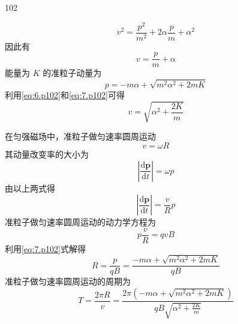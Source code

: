 \begin{solution}{102}
\begin{subsolution}
        \begin{equation*}
            v ^ {2} = \frac {p ^ {2}}{m ^ {2}} + 2 \alpha \frac {p}{m} + \alpha^ {2}
        \end{equation*}
        因此有
        \begin{equation}
            v = \frac {p}{m} + \alpha
            \label{eq:6.p102}
        \end{equation}
        能量为 $K$ 的准粒子动量为
        \begin{equation}
            p = - m \alpha + \sqrt {m ^ {2} \alpha^ {2} + 2 m K}
            \label{eq:7.p102}
        \end{equation}
        利用\eqref{eq:6.p102}和\eqref{eq:7.p102}可得
        \begin{equation}
            v = \sqrt {\alpha^ {2} + \frac {2 K}{m}}
            \label{eq:8.p102}
        \end{equation}
    \end{subsolution}
    \begin{subsolution}
        在匀强磁场中，准粒子做匀速率圆周运动
        \begin{equation*}
            v = \omega R
        \end{equation*}
        其动量改变率的大小为
        \begin{equation*}
            \left| \frac {\mathrm{d} \boldsymbol {p}}{\mathrm{d} t} \right| = \omega p
        \end{equation*}
        由以上两式得
        \begin{equation}
            \left| \frac {\mathrm{d} \boldsymbol {p}}{\mathrm{d} t} \right| = \frac {v}{R} p
            \label{eq:9.p102}
        \end{equation}
        准粒子做匀速率圆周运动的动力学方程为
        \begin{equation}
            p \frac {v}{R} = q v B
            \label{eq:10.p102}
        \end{equation}
        利用\eqref{eq:7.p102}式解得
        \begin{equation}
            R = \frac {p}{q B} = \frac {- m \alpha + \sqrt {m ^ {2} \alpha^ {2} + 2 m K}}{q B}
            \label{eq:11.p102}
        \end{equation}
        准粒子做匀速率圆周运动的周期为
        \begin{equation}
            T = \frac {2 \pi R}{v} = \frac {2 \pi \left(- m \alpha + \sqrt {m ^ {2} \alpha^ {2} + 2 m K}\right)}{q B \sqrt {\alpha^ {2} + \frac {2 K}{m}}}
            \label{eq:12.p102}

\end{equation}
\end{subsolution}
\end{solution}
